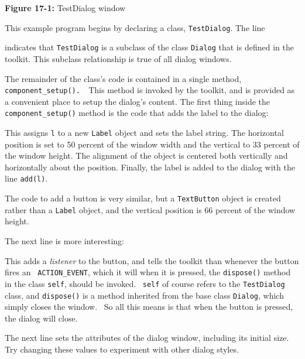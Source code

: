 {\sffamily\bfseries Figure 17-1:}
{\sffamily TestDialog window}

\bigskip

This example program begins by
declaring a class, \texttt{TestDialog}. The line


\noindent
indicates that \texttt{TestDialog} is a subclass of the
class \texttt{Dialog} that is defined in the toolkit. This subclass
relationship is true of all dialog windows. 

The remainder of the class's code is contained in a
single method, \texttt{component\_setup(). \ }This method is invoked by
the toolkit, and is provided as a convenient place to setup the
dialog's content. The first thing inside the
\texttt{component\_setup()} method is the code that adds the label to
the dialog: 


\noindent This assigns \texttt{l} to a new \texttt{Label} object
and sets the label string. The horizontal position is set to 50 percent of
the window width and the vertical to 33 percent of the window height.
The alignment of the object is centered both vertically and
horizontally about the position. Finally, the label is added to the
dialog with the line \texttt{add(l)}.

The code to add a button is very similar, but a \texttt{TextButton}
object is created rather than a \texttt{Label} object, and the vertical
position is 66 percent of the window height. 

The next line is more interesting:


\noindent This adds a \textit{listener} to the button, and tells the toolkit
than whenever the button fires an \ \texttt{ACTION\_EVENT}, which it will
when it is pressed, the \texttt{dispose()} method in the class
\texttt{self}, should be invoked. \ \texttt{self} of course refers to
the \texttt{TestDialog} class, and \texttt{dispose()} is a method
inherited from the base class \texttt{Dialog}, which simply closes the
window. \ So all this means is that when the button is pressed, the
dialog will close.

The next line sets the attributes of the dialog window, including its
initial size. Try changing these values to experiment with other dialog
styles.

